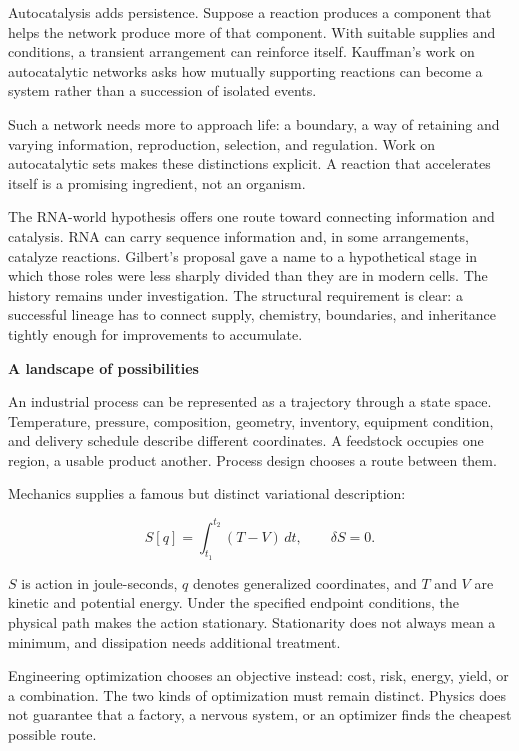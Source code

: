 \documentclass[11pt,openany]{book}
\newcommand{\subhead}[1]{\par\medskip\noindent\textbf{#1}\par\nobreak\smallskip}
\begin{document}
Autocatalysis adds persistence. Suppose a reaction produces a component that helps the network produce more of that component. With suitable supplies and conditions, a transient arrangement can reinforce itself. Kauffman's work on autocatalytic networks asks how mutually supporting reactions can become a system rather than a succession of isolated events.\cite{kauffman1993}

Such a network needs more to approach life: a boundary, a way of retaining and varying information, reproduction, selection, and regulation. Work on autocatalytic sets makes these distinctions explicit.\cite{hordijk2018} A reaction that accelerates itself is a promising ingredient, not an organism.

The RNA-world hypothesis offers one route toward connecting information and catalysis. RNA can carry sequence information and, in some arrangements, catalyze reactions. Gilbert's proposal gave a name to a hypothetical stage in which those roles were less sharply divided than they are in modern cells.\cite{gilbert1986} The history remains under investigation. The structural requirement is clear: a successful lineage has to connect supply, chemistry, boundaries, and inheritance tightly enough for improvements to accumulate.

\subhead{A landscape of possibilities}

An industrial process can be represented as a trajectory through a state space. Temperature, pressure, composition, geometry, inventory, equipment condition, and delivery schedule describe different coordinates. A feedstock occupies one region, a usable product another. Process design chooses a route between them.

Mechanics supplies a famous but distinct variational description:

\begin{equation}
S[q]=\int_{t_1}^{t_2}(T-V)\,dt,\qquad \delta S=0.
\end{equation}

$S$ is action in joule-seconds, $q$ denotes generalized coordinates, and $T$ and $V$ are kinetic and potential energy. Under the specified endpoint conditions, the physical path makes the action stationary. Stationarity does not always mean a minimum, and dissipation needs additional treatment.

Engineering optimization chooses an objective instead: cost, risk, energy, yield, or a combination. The two kinds of optimization must remain distinct. Physics does not guarantee that a factory, a nervous system, or an optimizer finds the cheapest possible route.
\end{document}
